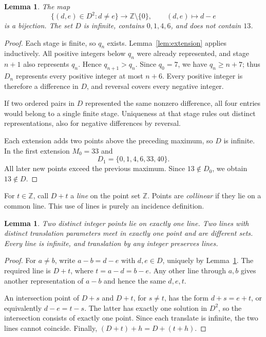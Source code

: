 \documentclass[11pt]{article}
\newtheorem{lemma}[theorem]{Lemma}
\theoremstyle{remark}
\newcommand{\Z}{\mathbb Z}
\begin{document}
\begin{lemma}\label{lem:perfect}
The map
\[
 \{(d,e)\in D^2:d\ne e\}\longrightarrow\Z\setminus\{0\},
 \qquad (d,e)\longmapsto d-e
\]
is a bijection. The set $D$ is infinite, contains $0,1,4,6$, and does
not contain $13$.
\end{lemma}

\begin{proof}
Each stage is finite, so $q_n$ exists. Lemma~\ref{lem:extension} applies
inductively. All positive integers below $q_n$ were already represented,
and stage $n+1$ also represents $q_n$. Hence $q_{n+1}>q_n$.
Since $q_0=7$, we have $q_n\ge n+7$; thus $D_n$ represents every
positive integer at most $n+6$. Every positive integer is therefore a
difference in $D$, and reversal covers every negative integer.

If two ordered pairs in $D$ represented the same nonzero difference,
all four entries would belong to a single finite stage. Uniqueness at
that stage rules out distinct representations, also for negative
differences by reversal.

Each extension adds two points above the preceding maximum, so $D$ is
infinite. In the first extension $M_0=33$ and
\[
 D_1=\{0,1,4,6,33,40\}.
\]
All later new points exceed the previous maximum. Since $13\notin D_0$,
we obtain $13\notin D$.
\end{proof}

For $t\in\Z$, call $D+t$ a \emph{line} on the point set $\Z$.
Points are \emph{collinear} if they lie on a common line.
This use of lines is purely an incidence definition.

\begin{lemma}\label{lem:incidence}
Two distinct integer points lie on exactly one line. Two lines with
distinct translation parameters meet in exactly one point and are
different sets. Every line is infinite, and translation by any integer
preserves lines.
\end{lemma}

\begin{proof}
For $a\ne b$, write $a-b=d-e$ with $d,e\in D$, uniquely by
Lemma~\ref{lem:perfect}. The required line is $D+t$, where
$t=a-d=b-e$. Any other line through $a,b$ gives another representation
of $a-b$ and hence the same $d,e,t$.

An intersection point of $D+s$ and $D+t$, for $s\ne t$, has the form
$d+s=e+t$, or equivalently $d-e=t-s$. The latter has exactly one
solution in $D^2$, so the intersection consists of exactly one point.
Since each translate is infinite, the two lines cannot coincide.
Finally, $(D+t)+h=D+(t+h)$.
\end{proof}
\end{document}
